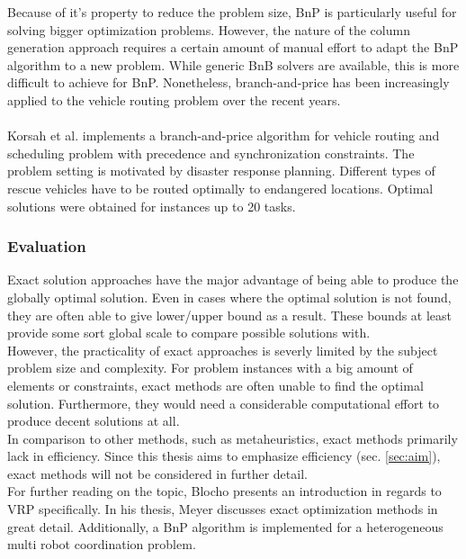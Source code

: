 Because of it's property to reduce the problem size, BnP is particularly useful for solving bigger optimization problems. However, the nature of the column generation approach requires a certain amount of manual effort to adapt the BnP algorithm to a new problem. While generic BnB solvers are available, this is more difficult to achieve for BnP. Nonetheless, branch-and-price has been increasingly applied to the vehicle routing problem over the recent years.\\ \\
Korsah et al. \cite{korsah_optimal_2010} implements a branch-and-price algorithm for vehicle routing and scheduling problem with precedence and synchronization constraints. The problem setting is motivated by disaster response planning. Different types of rescue vehicles have to be routed optimally to endangered locations. Optimal solutions were obtained for instances up to 20 tasks.

\subsubsection{Evaluation}

Exact solution approaches have the major advantage of being able to produce the globally optimal solution. Even in cases where the optimal solution is not found, they are often able to give lower/upper bound as a result. These bounds at least provide some sort global scale to compare possible solutions with.\\
However, the practicality of exact approaches is severly limited by the subject problem size and complexity. For problem instances with a big amount of elements or constraints, exact methods are often unable to find the optimal solution. Furthermore, they would need a considerable computational effort to produce decent solutions at all.\\
In comparison to other methods, such as metaheuristics, exact methods primarily lack in efficiency. Since this thesis aims to emphasize efficiency (sec. \ref{sec:aim}), exact methods will not be considered in further detail.\\
For further reading on the topic, Blocho \cite{blocho_chapter_2020} presents an introduction in regards to VRP specifically. In his thesis, Meyer \cite{meyer_entwicklung_2019} discusses exact optimization methods in great detail. Additionally, a BnP algorithm is implemented for a heterogeneous multi robot coordination problem.


